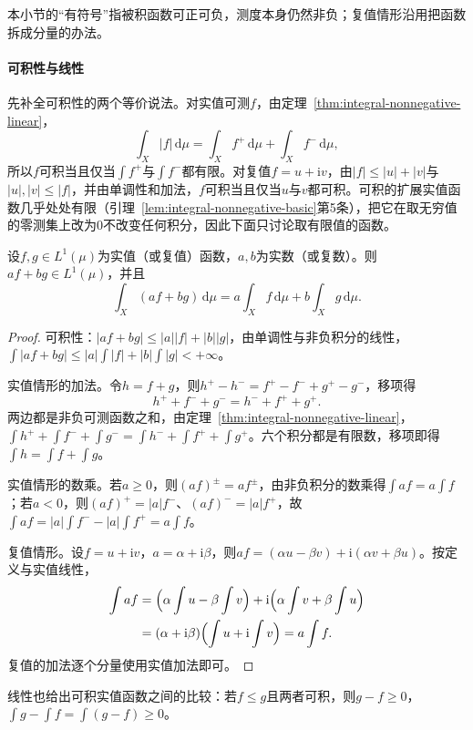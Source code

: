 本小节的“有符号”指被积函数可正可负，测度本身仍然非负；复值情形沿用把函数拆成分量的办法。

\paragraph{可积性与线性}
先补全可积性的两个等价说法。对实值可测$f$，由定理~\ref{thm:integral-nonnegative-linear}，
\[
 \int_X|f|\,\mathrm d\mu=\int_Xf^+\,\mathrm d\mu+\int_Xf^-\,\mathrm d\mu,
\]
所以$f$可积当且仅当$\int f^+$与$\int f^-$都有限。对复值$f=u+\mathrm iv$，由$|f|\le|u|+|v|$与$|u|,|v|\le|f|$，并由单调性和加法，$f$可积当且仅当$u$与$v$都可积。可积的扩展实值函数几乎处处有限（引理~\ref{lem:integral-nonnegative-basic}第5条），把它在取无穷值的零测集上改为$0$不改变任何积分，因此下面只讨论取有限值的函数。

\begin{theorem}[积分的线性]
\label{thm:integral-linear}
设$f,g\in L^1(\mu)$为实值（或复值）函数，$a,b$为实数（或复数）。则$af+bg\in L^1(\mu)$，并且
\[
 \int_X(af+bg)\,\mathrm d\mu=a\int_Xf\,\mathrm d\mu+b\int_Xg\,\mathrm d\mu.
\]
\end{theorem}

\begin{proof}
可积性：$|af+bg|\le|a||f|+|b||g|$，由单调性与非负积分的线性，$\int|af+bg|\le|a|\int|f|+|b|\int|g|<+\infty$。

实值情形的加法。令$h=f+g$，则$h^+-h^-=f^+-f^-+g^+-g^-$，移项得
\[
 h^++f^-+g^-=h^-+f^++g^+.
\]
两边都是非负可测函数之和，由定理~\ref{thm:integral-nonnegative-linear}，$\int h^++\int f^-+\int g^-=\int h^-+\int f^++\int g^+$。六个积分都是有限数，移项即得$\int h=\int f+\int g$。

实值情形的数乘。若$a\ge0$，则$(af)^\pm=af^\pm$，由非负积分的数乘得$\int af=a\int f$；若$a<0$，则$(af)^+=|a|f^-$、$(af)^-=|a|f^+$，故$\int af=|a|\int f^--|a|\int f^+=a\int f$。

复值情形。设$f=u+\mathrm iv$，$a=\alpha+\mathrm i\beta$，则$af=(\alpha u-\beta v)+\mathrm i(\alpha v+\beta u)$。按定义与实值线性，
\[
 \begin{aligned}
  \int af&=\Bigl(\alpha\int u-\beta\int v\Bigr)+\mathrm i\Bigl(\alpha\int v+\beta\int u\Bigr)\\
  &=(\alpha+\mathrm i\beta)\Bigl(\int u+\mathrm i\int v\Bigr)=a\int f.
 \end{aligned}
\]
复值的加法逐个分量使用实值加法即可。
\end{proof}

线性也给出可积实值函数之间的比较：若$f\le g$且两者可积，则$g-f\ge0$，$\int g-\int f=\int(g-f)\ge0$。

